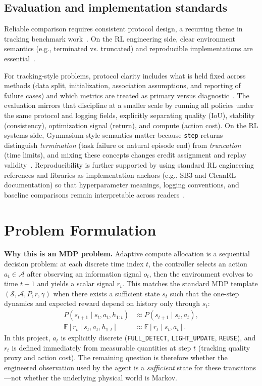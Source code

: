 \documentclass[letterpaper]{article}
\begin{document}
\subsection{Evaluation and implementation standards}
Reliable comparison requires consistent protocol design, a recurring theme in tracking benchmark work~\cite{lealtaixe2015mot}. On the RL engineering side, clear environment semantics (e.g., terminated vs. truncated) and reproducible implementations are essential~\cite{gymapi,gymstep}.

For tracking-style problems, protocol clarity includes what is held fixed across methods (data split, initialization, association assumptions, and reporting of failure cases) and which metrics are treated as primary versus diagnostic~\cite{lealtaixe2015mot}. The evaluation mirrors that discipline at a smaller scale by running all policies under the same protocol and logging fields, explicitly separating quality (IoU), stability (consistency), optimization signal (return), and compute (action cost). On the RL systems side, Gymnasium-style semantics matter because \texttt{step} returns distinguish \emph{termination} (task failure or natural episode end) from \emph{truncation} (time limits), and mixing these concepts changes credit assignment and replay validity~\cite{gymapi,gymstep}. Reproducibility is further supported by using standard RL engineering references and libraries as implementation anchors (e.g., SB3 and CleanRL documentation) so that hyperparameter meanings, logging conventions, and baseline comparisons remain interpretable across readers~\cite{sb3,cleanrldocs}.

\section{Problem Formulation}
\label{sec:problem}
\noindent\textbf{Why this is an MDP problem.}
Adaptive compute allocation is a sequential decision problem: at each discrete time index $t$, the controller selects an action $a_t\in\mathcal{A}$ after observing an information signal $o_t$, then the environment evolves to time $t{+}1$ and yields a scalar signal $r_t$. This matches the standard MDP template $(\mathcal{S},\mathcal{A},P,r,\gamma)$ when there exists a sufficient state $s_t$ such that the one-step dynamics and expected reward depend on history only through $s_t$:
\[
\begin{aligned}
P(s_{t+1}\mid s_t,a_t,h_{1:t}) &\approx P(s_{t+1}\mid s_t,a_t),\\
\mathbb{E}[r_t\mid s_t,a_t,h_{1:t}] &\approx \mathbb{E}[r_t\mid s_t,a_t].
\end{aligned}
\]
In this project, $a_t$ is explicitly discrete (\texttt{FULL\_DETECT}, \texttt{LIGHT\_UPDATE}, \texttt{REUSE}), and $r_t$ is defined immediately from measurable quantities at step $t$ (tracking quality proxy and action cost). The remaining question is therefore whether the engineered observation used by the agent is a \emph{sufficient} state for these transitions---not whether the underlying physical world is Markov.
\end{document}
